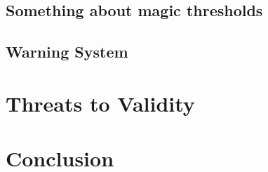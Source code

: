 \documentclass[acmsmall,screen,review,anonymous]{acmart}
\begin{document}
\subsection{Something about magic thresholds}\label{sec:magic-threshold}

\subsection{Warning System}\label{sec:drift}

\section{Threats to Validity}\label{sec:threats}

\section{Conclusion}\label{sec:conclude}



\end{document}
